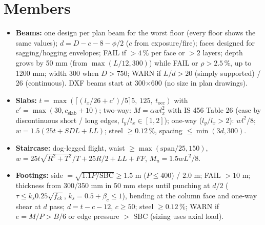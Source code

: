 \documentclass[10pt,a4paper]{article}
\newcommand{\fck}{f_{ck}}
\begin{document}
\section{Members}
\begin{itemize}
\item \textbf{Beams:} one design per plan beam for the worst floor (every floor shows the same values);
$d=D-c-8-\phi/2$ ($c$ from exposure/fire); faces designed for sagging/hogging envelopes; FAIL if
$>4\,\%$ per face or $>2$ layers; depth grows by 50 mm (from $\max(L/12,300)$) while FAIL or $\rho>2.5\,\%$, up to
1200 mm; width 300 when $D>750$; WARN if $L/d>20$ (simply supported) / 26 (continuous). DXF beams start at
300$\times$600 (no size in plan drawings).
\item \textbf{Slabs:} $t=\max\left(\lceil(l_x/26+c')/5\rceil5,\ 125,\ t_\text{occ}\right)$ with $c'=\max(30,c_\text{slab}+10)$;
two-way: $M=\alpha w l_x^2$ with IS 456 Table 26 (case by discontinuous short / long edges, $l_y/l_x\in[1,2]$);
one-way ($l_y/l_x>2$): $wl^2/8$; $w=1.5(25t+SDL+LL)$; steel $\ge0.12\,\%$, spacing $\le\min(3d,300)$.
\item \textbf{Staircase:} dog-legged flight, waist $\ge\max(\text{span}/25,150)$,
$w=25t\sqrt{R^2+T^2}/T+25R/2+LL+FF$, $M_u=1.5wL^2/8$.
\item \textbf{Footings:} side $=\sqrt{1.1P/\text{SBC}}\ge1.5$ m ($P\le400$) / 2.0 m; FAIL $>10$ m; thickness from
300/350 mm in 50 mm steps until punching at $d/2$ ($\tau\le k_s0.25\sqrt{\fck}$, $k_s=0.5+\beta_c\le1$), bending at
the column face and one-way shear at $d$ pass; $d=t-c-12$, $c\ge50$; steel $\ge0.12\,\%$; WARN if $e=M/P>B/6$ or
edge pressure $>$ SBC (sizing uses axial load).
\end{itemize}
\end{document}
